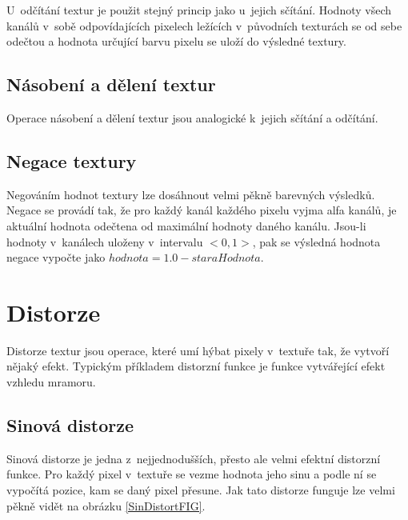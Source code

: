 U~odčítání textur je použit stejný princip jako u~jejich sčítání.
Hodnoty všech kanálů v~sobě odpovídajících pixelech ležících v~původních texturách se od sebe odečtou a hodnota určující barvu pixelu se uloží do výsledné textury.
\subsection{Násobení a dělení textur}
Operace násobení a dělení textur jsou analogické k~jejich sčítání a odčítání.
\subsection{Negace textury}
Negováním hodnot textury lze dosáhnout velmi pěkně barevných výsledků.
Negace se provádí tak, že pro každý kanál každého pixelu vyjma alfa kanálů, je aktuální hodnota odečtena od maximální hodnoty daného kanálu.
Jsou-li hodnoty v~kanálech uloženy v~intervalu $<0,1>$, pak se výsledná hodnota negace vypočte jako $hodnota = 1.0 - staraHodnota$.

\section{Distorze} \label{texturyDist}
Distorze textur jsou operace, které umí hýbat pixely v~textuře tak, že vytvoří nějaký efekt.
Typickým příkladem distorzní funkce je funkce vytvářející efekt vzhledu mramoru.

\subsection{Sinová distorze}
Sinová distorze je jedna z~nejjednodušších, přesto ale velmi efektní distorzní funkce.
Pro každý pixel v~textuře se vezme hodnota jeho sinu a podle ní se vypočítá pozice, kam se daný pixel přesune.
Jak tato distorze funguje lze velmi pěkně vidět na obrázku \ref{SinDistortFIG}.

